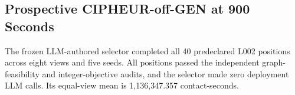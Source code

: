 \subsection{Prospective CIPHEUR-off-GEN at 900 Seconds}
The frozen LLM-authored selector completed all 40 predeclared L002 positions across eight views and five seeds. All positions passed the independent graph-feasibility and integer-objective audits, and the selector made zero deployment LLM calls. Its equal-view mean is 1,136,347.357 contact-seconds.
